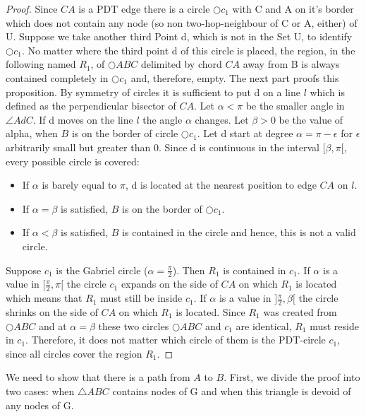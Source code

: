 \begin{proof}
Since $CA $ is a PDT edge there is a circle $\bigcirc{c_1} $ with C and A on it's border which does not contain any node (so non two-hop-neighbour of C or A, either) of U.
Suppose we take another third Point d, which is not in the Set U, to identify $\bigcirc{c_1} $.
No matter where the third point d of this circle is placed, the region, in the following named $R_1 $, of $\bigcirc{ABC} $ delimited by chord $CA $ away from B is always contained completely in $\bigcirc{c_1} $ and, therefore, empty.
The next part proofs this proposition.
By symmetry of circles it is sufficient to put d on a line  $l $ which is defined as the perpendicular bisector of $CA $.
Let $\alpha<\pi $ be the smaller angle in $\angle{AdC} $.
If d moves on the line $l $ the angle $\alpha $ changes.   
Let $\beta >0$ be the value of alpha, when $B $ is on the border of circle $\bigcirc{c_1} $.
Let d start at degree $\alpha = \pi-\epsilon $ for $\epsilon $  arbitrarily small but greater than $0 $.
Since d is continuous in the interval $[\beta,\pi[ $, every possible circle is covered:
\begin{itemize}
\item If $\alpha $ is barely equal to $\pi $, d is located at the nearest position to edge $CA $ on $l $.
\item If $\alpha=\beta $ is satisfied, $B $ is on the border of $\bigcirc{c_1} $.
\item If $\alpha <\beta $ is satisfied, $B $ is contained in the circle and hence, this is not a valid circle.
\end{itemize}
Suppose $c_1 $ is the Gabriel circle ($\alpha=\frac{\pi}{2} $).
Then $R_1 $ is contained in $c_1 $. 
If $\alpha $ is a value in $[\frac{\pi}{2},\pi[ $ the circle $c_1 $ expands on the side of $CA $ on which $R_1 $ is located which means that $R_1 $ must still be inside $c_1 $.
If $\alpha $ is a value in $]\frac{\pi}{2},\beta[ $ the circle shrinks on the side of $CA $ on which $R_1 $ is located.
Since $R_1 $ was created from $\bigcirc{ABC} $ and at $\alpha=\beta $ these two circles $\bigcirc{ABC} $ and $c_1 $ are identical, $R_1 $ must reside in $c_1 $.    
Therefore, it does not matter which circle of them is the PDT-circle $c_1 $, since all circles cover the region $R_1 $.

\end{proof} 



We need to show that there is a path from $A $ to $B $.
First, we divide the proof into two cases: when $\triangle{ABC} $ contains nodes of G and when this triangle is devoid of any nodes of G.

